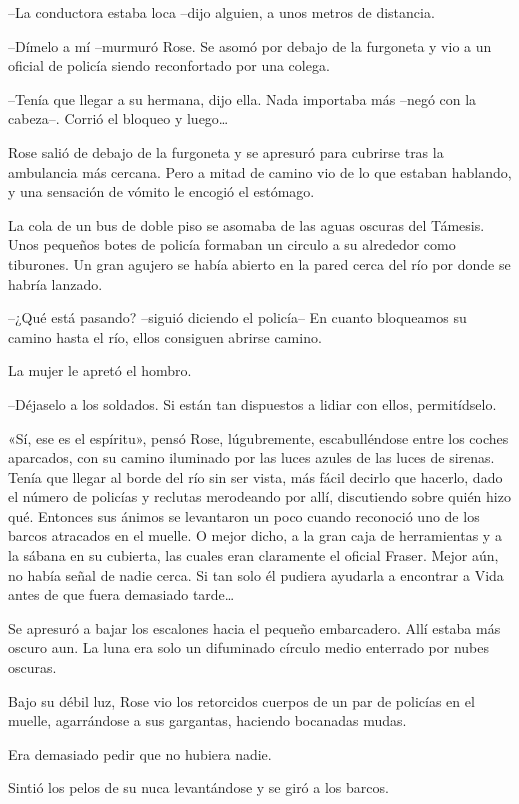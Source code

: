{--La conductora estaba loca --dijo alguien, a unos metros de
distancia.}

{--Dímelo a mí --murmuró Rose. Se asomó por debajo de la furgoneta y vio
a un oficial de policía siendo reconfortado por una colega.}

{--Tenía que llegar a su hermana, dijo ella. Nada importaba más --negó
 con la cabeza--. Corrió el bloqueo y luego\ldots{}}

{Rose salió de debajo de la furgoneta y se apresuró para cubrirse tras
 la ambulancia más cercana. Pero a mitad de camino vio de lo que estaban
hablando, y una sensación de vómito le encogió el estómago.}

{La cola de un bus de doble piso se asomaba de las aguas oscuras del
 Támesis. Unos pequeños botes de policía formaban un circulo a su
 alrededor como tiburones. Un gran agujero se había abierto en la pared
cerca del río por donde se habría lanzado.}

{--¿Qué está pasando? --siguió diciendo el policía-- En cuanto
bloqueamos su camino hasta el río, ellos consiguen abrirse camino.}

{La mujer le apretó el hombro.}

{--Déjaselo a los soldados. Si están tan dispuestos a lidiar con ellos,
permitídselo.}

{«Sí, ese es el espíritu», pensó Rose, lúgubremente, escabulléndose
 entre los coches aparcados, con su camino iluminado por las luces azules
 de las luces de sirenas. Tenía que llegar al borde del río sin ser
 vista, más fácil decirlo que hacerlo, dado el número de policías y
 reclutas merodeando por allí, discutiendo sobre quién hizo qué. Entonces
 sus ánimos se levantaron un poco cuando reconoció uno de los barcos
 atracados en el muelle. O mejor dicho, a la gran caja de herramientas y
 a la sábana en su cubierta, las cuales eran claramente el oficial
 Fraser. Mejor aún, no había señal de nadie cerca. Si tan solo él pudiera
 ayudarla a encontrar a Vida antes de que fuera demasiado tarde\ldots{}}

{Se apresuró a bajar los escalones hacia el pequeño embarcadero. Allí
 estaba más oscuro aun. La luna era solo un difuminado círculo medio
enterrado por nubes oscuras.}

{Bajo su débil luz, Rose vio los retorcidos cuerpos de un par de
 policías en el muelle, agarrándose a sus gargantas, haciendo bocanadas
mudas.}

{Era demasiado pedir que no hubiera nadie.}

{Sintió los pelos de su nuca levantándose y se giró a los barcos.}

